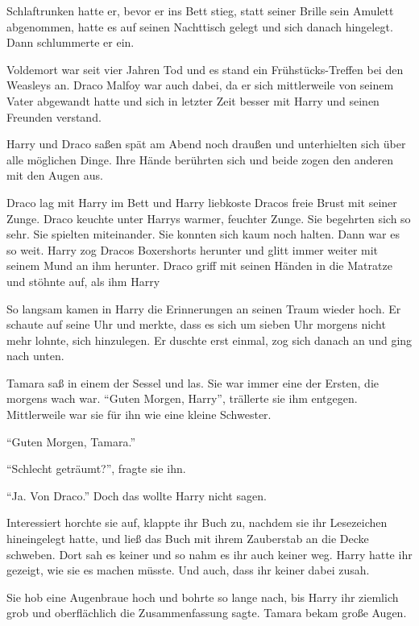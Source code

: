 Schlaftrunken hatte er, bevor er ins Bett stieg, statt seiner Brille sein Amulett abgenommen, hatte es auf seinen Nachttisch gelegt und sich danach hingelegt. Dann schlummerte er ein.

\begin{traum}
Voldemort war seit vier Jahren Tod und es stand ein Frühstücks-Treffen bei den Weasleys an. Draco Malfoy war auch dabei, da er sich mittlerweile von seinem Vater abgewandt hatte und sich in letzter Zeit besser mit Harry und seinen Freunden verstand. \gst

Harry und Draco saßen spät am Abend noch draußen und unterhielten sich über alle möglichen Dinge. Ihre Hände berührten sich und beide zogen den anderen mit den Augen aus. \gst

Draco lag mit Harry im Bett und Harry liebkoste Dracos freie Brust mit seiner Zunge. Draco keuchte unter Harrys warmer, feuchter Zunge. Sie begehrten sich so sehr. Sie spielten miteinander. Sie konnten sich kaum noch halten. Dann war es so weit. Harry zog Dracos Boxershorts herunter und glitt immer weiter mit seinem Mund an ihm herunter. Draco griff mit seinen Händen in die Matratze und stöhnte auf, als ihm Harry \gst
\end{traum}

So langsam kamen in Harry die Erinnerungen an seinen Traum wieder hoch. Er schaute auf seine Uhr und merkte, dass es sich um sieben Uhr morgens nicht mehr lohnte, sich hinzulegen. Er duschte erst einmal, zog sich danach an und ging nach unten.

Tamara saß in einem der Sessel und las. Sie war immer eine der Ersten, die morgens wach war. \enquote{Guten Morgen, Harry}, trällerte sie ihm entgegen. Mittlerweile war sie für ihn wie eine kleine Schwester.

\enquote{Guten Morgen, Tamara.}

\enquote{Schlecht geträumt?}, fragte sie ihn.

\enquote{Ja. Von Draco.} Doch das wollte Harry nicht sagen.

Interessiert horchte sie auf, klappte ihr Buch zu, nachdem sie ihr Lesezeichen hineingelegt hatte, und ließ das Buch mit ihrem Zauberstab an die Decke schweben. Dort sah es keiner und so nahm es ihr auch keiner weg. Harry hatte ihr gezeigt, wie sie es machen müsste. Und auch, dass ihr keiner dabei zusah.

Sie hob eine Augenbraue hoch und bohrte so lange nach, bis Harry ihr ziemlich grob und oberflächlich die Zusammenfassung sagte. Tamara bekam große Augen.

